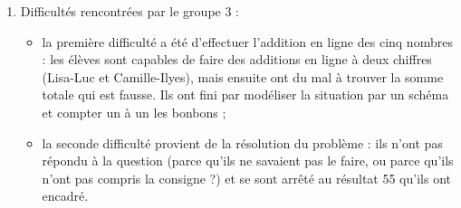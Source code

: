 \begin{corrige}
\begin{enumerate}
\begin{enumerate}
\begin{itemize}
      \end{itemize}
   \end{enumerate}
   \setcounter{enumi}{2} 
   \item Difficultés rencontrées par le groupe 3 :
   \begin{itemize}
      \item la première difficulté a été d'effectuer l'addition en ligne des cinq nombres : les élèves sont capables de faire des additions en ligne à deux chiffres (Lisa-Luc et Camille-Ilyes), mais ensuite ont du mal à trouver la somme totale qui est fausse. Ils ont fini par modéliser la situation par un schéma et compter un à un les bonbons ;
      \item la seconde difficulté provient de la résolution du problème : ils n'ont pas répondu à la question (parce qu'ils ne savaient pas le faire, ou parce qu'ils n'ont pas compris la consigne ?) et se sont arrêté au résultat 55 qu'ils ont encadré.
   \end{itemize}
\end{enumerate}
\end{corrige}


\Recreation %

\setcounter{exercice}{0}


